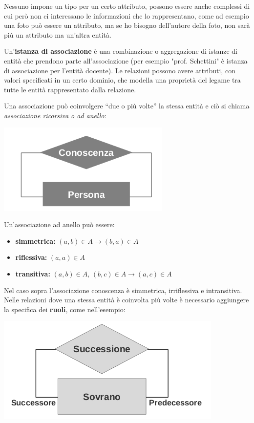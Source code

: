 \documentclass[a4paper,12pt, oneside]{book}
\begin{document}
Nessuno impone un tipo per un certo attributo, possono essere anche complessi di cui però non ci interessano le informazioni
che lo rappresentano, come ad esempio una foto può essere un attributo, ma se ho bisogno dell'autore della foto,
non sarà più un attributo ma un'altra entità. 

Un'\textbf{istanza di associazione} è una combinazione o aggregazione di istanze di entità che prendono
parte all'associazione (per esempio "prof. Schettini" è istanza di associazione per l'entità docente).\newline
Le relazioni possono avere attributi, con valori specificati in un certo dominio, che  modella una proprietà del legame
tra tutte le entità rappresentato dalla relazione.

Una associazione può coinvolgere “due o più volte” la stessa entità e ciò si chiama \emph{associazione ricorsiva o ad anello}:
\begin{center}
\includegraphics[scale=2.5]{img/bas7.png}
\end{center}
Un'associazione ad anello può essere:
\begin{itemize}
    \item \textbf{simmetrica:} $(a,b)\in A \to (b,a) \in A$
    \item \textbf{riflessiva:} $(a,a)\in A$
    \item \textbf{transitiva:} $(a,b) \in A,\,(b,c) \in A \to (a,c)\in A$
\end{itemize}
Nel caso sopra l'associazione conoscenza è simmetrica, irriflessiva e intransitiva.\newline
Nelle relazioni dove una stessa entità è coinvolta più volte è necessario aggiungere la specifica dei \textbf{ruoli}, come nell'esempio:
\begin{center}
    \includegraphics[scale=2.5]{img/bas8.png}
\end{center}
\end{document}

